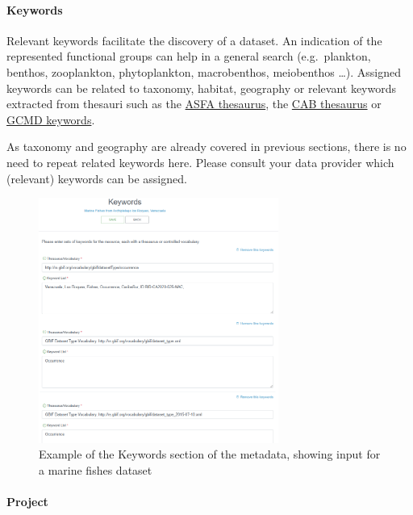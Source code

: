 \documentclass[
  letterpaper,
  DIV=11,
  numbers=noendperiod,
  oneside]{scrreprt}
\let\oldparagraph\paragraph
\renewcommand{\paragraph}[1]{\oldparagraph{#1}\mbox{}}
\begin{document}
\hypertarget{keywords}{%
\paragraph{Keywords}\label{keywords}}

Relevant keywords facilitate the discovery of a dataset. An indication
of the represented functional groups can help in a general search
(e.g.~plankton, benthos, zooplankton, phytoplankton, macrobenthos,
meiobenthos \ldots). Assigned keywords can be related to taxonomy,
habitat, geography or relevant keywords extracted from thesauri such as
the \href{https://vocabularyserver.com/asfa/}{ASFA thesaurus}, the
\href{http://www.cabi.org/cabthesaurus/}{CAB thesaurus} or
\href{https://www.earthdata.nasa.gov/learn/find-data/idn/gcmd-keywords}{GCMD
keywords}.

As taxonomy and geography are already covered in previous sections,
there is no need to repeat related keywords here. Please consult your
data provider which (relevant) keywords can be assigned.

\begin{figure}

{\centering \includegraphics[width=0.7\textwidth,height=\textheight]{images/ipt-ss16-meta-keyword.png}

}

\caption{Example of the Keywords section of the metadata, showing input
for a marine fishes dataset}

\end{figure}

\hypertarget{project}{%
\paragraph{Project}\label{project}}
\end{document}
